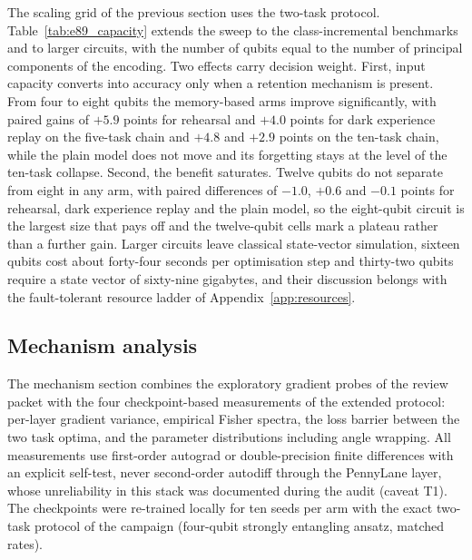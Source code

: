 \documentclass[preprint,number,sort&compress]{elsarticle}
\begin{document}
The scaling grid of the previous section uses the two-task protocol. Table~\ref{tab:e89_capacity}
extends the sweep to the class-incremental benchmarks and to larger circuits, with the number
of qubits equal to the number of principal components of the encoding. Two effects carry
decision weight. First, input capacity converts into accuracy only when a retention mechanism
is present. From four to eight qubits the memory-based arms improve significantly, with paired
gains of $+5.9$ points for rehearsal and $+4.0$ points for dark experience replay on the
five-task chain and $+4.8$ and $+2.9$ points on the ten-task chain, while the plain model does
not move and its forgetting stays at the level of the ten-task collapse. Second, the benefit
saturates. Twelve qubits do not separate from eight in any arm, with paired differences of
$-1.0$, $+0.6$ and $-0.1$ points for rehearsal, dark experience replay and the plain model,
so the eight-qubit circuit is the largest size that pays off and the twelve-qubit cells mark
a plateau rather than a further gain. Larger circuits leave classical state-vector simulation,
sixteen qubits cost about forty-four seconds per optimisation step and thirty-two qubits
require a state vector of sixty-nine gigabytes, and their discussion belongs with the
fault-tolerant resource ladder of Appendix~\ref{app:resources}.



\subsection{Mechanism analysis}
\label{sec:mechanism}

The mechanism section combines the exploratory gradient probes of the
review packet with the four checkpoint-based measurements of the extended
protocol: per-layer gradient variance, empirical Fisher spectra, the loss
barrier between the two task optima, and the parameter distributions
including angle wrapping. All measurements use first-order autograd or
double-precision finite differences with an explicit self-test, never
second-order autodiff through the PennyLane layer, whose unreliability in
this stack was documented during the audit (caveat T1). The checkpoints
were re-trained locally for ten seeds per arm with the exact two-task
protocol of the campaign (four-qubit strongly entangling ansatz, matched
rates).
\end{document}
